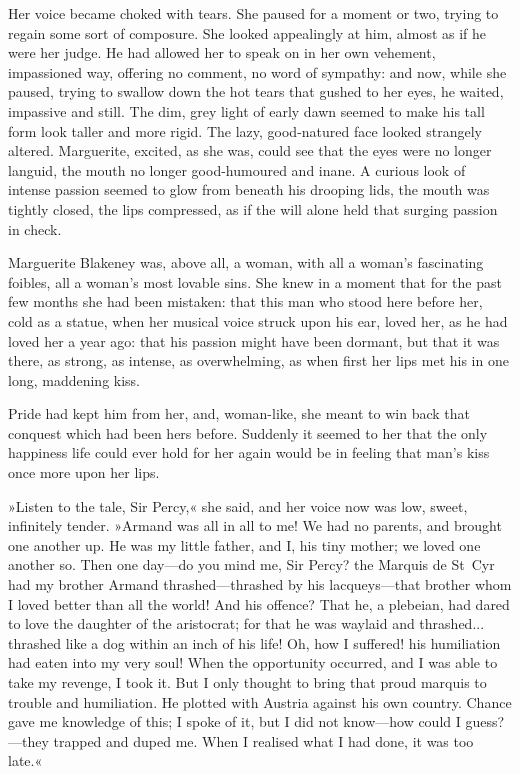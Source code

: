 Her voice became choked with tears. She paused for a moment or two, trying to regain some sort of composure. She looked appealingly at him, almost as if he were her judge. He had allowed her to speak on in her own vehement, impassioned way, offering no comment, no word of sympathy: and now, while she paused, trying to swallow down the hot tears that gushed to her eyes, he waited, impassive and still. The dim, grey light of early dawn seemed to make his tall form look taller and more rigid. The lazy, good-natured face looked strangely altered. Marguerite, excited, as she was, could see that the eyes were no longer languid, the mouth no longer good-humoured and inane. A curious look of intense passion seemed to glow from beneath his drooping lids, the mouth was tightly closed, the lips compressed, as if the will alone held that surging passion in check.

Marguerite Blakeney was, above all, a woman, with all a woman's fascinating foibles, all a woman's most lovable sins. She knew in a moment that for the past few months she had been mistaken: that this man who stood here before her, cold as a statue, when her musical voice struck upon his ear, loved her, as he had loved her a year ago: that his passion might have been dormant, but that it was there, as strong, as intense, as overwhelming, as when first her lips met his in one long, maddening kiss.

Pride had kept him from her, and, woman-like, she meant to win back that conquest which had been hers before. Suddenly it seemed to her that the only happiness life could ever hold for her again would be in feeling that man's kiss once more upon her lips.

»Listen to the tale, Sir Percy,« she said, and her voice now was low, sweet, infinitely tender. »Armand was all in all to me! We had no parents, and brought one another up. He was my little father, and I, his tiny mother; we loved one another so. Then one day\allowbreak---\allowbreak do you mind me, Sir Percy? the Marquis de St~Cyr had my brother Armand thrashed\allowbreak---\allowbreak thrashed by his lacqueys\allowbreak---\allowbreak that brother whom I loved better than all the world! And his offence? That he, a plebeian, had dared to love the daughter of the aristocrat; for that he was waylaid and thrashed... thrashed like a dog within an inch of his life! Oh, how I suffered! his humiliation had eaten into my very soul! When the opportunity occurred, and I was able to take my revenge, I took it. But I only thought to bring that proud marquis to trouble and humiliation. He plotted with Austria against his own country. Chance gave me knowledge of this; I spoke of it, but I did not know\allowbreak---\allowbreak how could I guess?\allowbreak---\allowbreak they trapped and duped me. When I realised what I had done, it was too late.«

